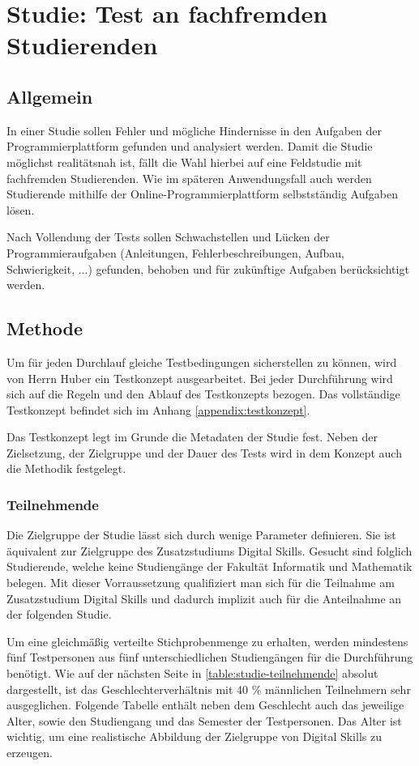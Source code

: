 \section{Studie: Test an fachfremden Studierenden}\label{studie}
\subsection{Allgemein}
In einer Studie sollen Fehler und mögliche Hindernisse in den Aufgaben der
Programmierplattform gefunden und analysiert werden. Damit die Studie möglichst
realitätsnah ist, fällt die Wahl hierbei auf eine Feldstudie mit fachfremden
Studierenden. Wie im späteren Anwendungsfall auch werden Studierende mithilfe
der Online-Programmierplattform selbstständig Aufgaben lösen.
\parencite{feldstudie}

Nach Vollendung der Tests sollen Schwachstellen und Lücken der
Programmieraufgaben (Anleitungen, Fehlerbeschreibungen, Aufbau, Schwierigkeit,
...) gefunden, behoben und für zukünftige Aufgaben berücksichtigt werden.

\subsection{Methode}
Um für jeden Durchlauf gleiche Testbedingungen sicherstellen zu können, wird von
Herrn Huber ein Testkonzept ausgearbeitet. Bei jeder Durchführung wird sich auf
die Regeln und den Ablauf des Testkonzepts bezogen. Das vollständige Testkonzept
befindet sich im Anhang \ref{appendix:testkonzept}.

Das Testkonzept legt im Grunde die Metadaten der Studie fest. Neben der
Zielsetzung, der Zielgruppe und der Dauer des Tests wird in dem Konzept auch die
Methodik festgelegt.

\subsubsection{Teilnehmende}
Die Zielgruppe der Studie lässt sich durch wenige Parameter definieren. Sie
ist äquivalent zur Zielgruppe des Zusatzstudiums Digital Skills. Gesucht sind
folglich Studierende, welche keine Studiengänge der Fakultät Informatik und
Mathematik belegen. Mit dieser Vorraussetzung qualifiziert man sich für die
Teilnahme am Zusatzstudium Digital Skills und dadurch implizit auch für die
Anteilnahme an der folgenden Studie.

Um eine gleichmäßig verteilte Stichprobenmenge zu erhalten, werden mindestens
fünf Testpersonen aus fünf unterschiedlichen Studiengängen für die Durchführung
benötigt. Wie auf der nächsten Seite in \autoref{table:studie-teilnehmende}
absolut dargestellt, ist das Geschlechterverhältnis mit 40 \% männlichen
Teilnehmern sehr ausgeglichen. Folgende Tabelle enthält neben dem Geschlecht
auch das jeweilige Alter, sowie den Studiengang und das Semester der
Testpersonen. Das Alter ist wichtig, um eine realistische Abbildung der
Zielgruppe von Digital Skills zu erzeugen.

